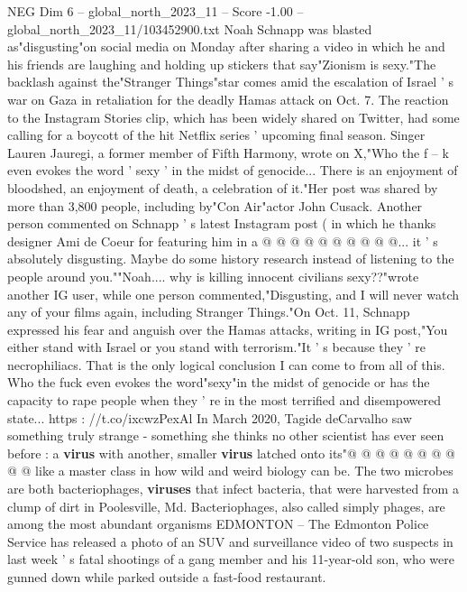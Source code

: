 \begin{textsample}{NEG Dim 6 – global\_north\_2023\_11 – Score -1.00 – global\_north\_2023\_11/103452900.txt}  \label{ex:f6_neg_228}
Noah Schnapp was blasted as"disgusting"on social media on Monday after sharing a video in which he and his friends are laughing and holding up stickers that say"Zionism is sexy."The backlash against the"Stranger Things"star comes amid the escalation of Israel ' s war on Gaza in retaliation for the deadly Hamas attack on Oct. 7.
The reaction to the Instagram Stories clip, which has been widely shared on Twitter, had some calling for a boycott of the hit Netflix series ' upcoming final season.
Singer Lauren Jauregi, a former member of Fifth Harmony, wrote on X,"Who the f -- k even evokes the word ' sexy ' in the midst of genocide...
There is an enjoyment of bloodshed, an enjoyment of death, a celebration of it."Her post was shared by more than 3,800 people, including by"Con Air"actor John Cusack.
Another person commented on Schnapp ' s latest Instagram post ( in which he thanks designer Ami de Coeur for featuring him in a @ @ @ @ @ @ @ @ @ @... it ' s absolutely disgusting.
Maybe do some history research instead of listening to the people around you.""Noah.... why is killing innocent civilians sexy??"wrote another IG user, while one person commented,"Disgusting, and I will never watch any of your films again, including Stranger Things."On Oct. 11, Schnapp expressed his fear and anguish over the Hamas attacks, writing in IG post,"You either stand with Israel or you stand with terrorism."It ' s because they ' re necrophiliacs.
That is the only logical conclusion I can come to from all of this.
Who the fuck even evokes the word"sexy"in the midst of genocide or has the capacity to rape people when they ' re in the most terrified and disempowered state... https : //t.co/ixcwzPexAl In March 2020, Tagide deCarvalho saw something truly strange - something she thinks no other scientist has ever seen before : a \textbf{virus} with another, smaller \textbf{virus} latched onto its"@ @ @ @ @ @ @ @ @ @ like a master class in how wild and weird biology can be.
The two microbes are both bacteriophages, \textbf{viruses} that infect bacteria, that were harvested from a clump of dirt in Poolesville, Md.
Bacteriophages, also called simply phages, are among the most abundant organisms EDMONTON -- The Edmonton Police Service has released a photo of an SUV and surveillance video of two suspects in last week ' s fatal shootings of a gang member and his 11-year-old son, who were gunned down while parked outside a fast-food restaurant.

\end{textsample}
